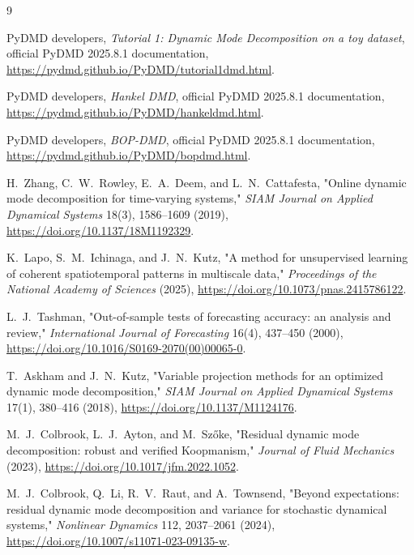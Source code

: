 \documentclass[11pt]{article}
\begin{document}
\begin{thebibliography}{9}

PyDMD developers, \emph{Tutorial 1: Dynamic Mode Decomposition on a toy
dataset}, official PyDMD 2025.8.1 documentation,
\url{https://pydmd.github.io/PyDMD/tutorial1dmd.html}.

PyDMD developers, \emph{Hankel DMD}, official PyDMD 2025.8.1 documentation,
\url{https://pydmd.github.io/PyDMD/hankeldmd.html}.

PyDMD developers, \emph{BOP-DMD}, official PyDMD 2025.8.1 documentation,
\url{https://pydmd.github.io/PyDMD/bopdmd.html}.

H.~Zhang, C.~W.~Rowley, E.~A.~Deem, and L.~N.~Cattafesta,
"Online dynamic mode decomposition for time-varying systems,"
\emph{SIAM Journal on Applied Dynamical Systems} 18(3), 1586--1609 (2019),
\url{https://doi.org/10.1137/18M1192329}.

K.~Lapo, S.~M.~Ichinaga, and J.~N.~Kutz,
"A method for unsupervised learning of coherent spatiotemporal patterns in
multiscale data," \emph{Proceedings of the National Academy of Sciences}
(2025), \url{https://doi.org/10.1073/pnas.2415786122}.

L.~J.~Tashman, "Out-of-sample tests of forecasting accuracy: an analysis and
review," \emph{International Journal of Forecasting} 16(4), 437--450 (2000),
\url{https://doi.org/10.1016/S0169-2070(00)00065-0}.

T.~Askham and J.~N.~Kutz, "Variable projection methods for an optimized
dynamic mode decomposition," \emph{SIAM Journal on Applied Dynamical
Systems} 17(1), 380--416 (2018),
\url{https://doi.org/10.1137/M1124176}.

M.~J.~Colbrook, L.~J.~Ayton, and M.~Szőke, "Residual dynamic mode
decomposition: robust and verified Koopmanism," \emph{Journal of Fluid
Mechanics} (2023), \url{https://doi.org/10.1017/jfm.2022.1052}.

M.~J.~Colbrook, Q.~Li, R.~V.~Raut, and A.~Townsend, "Beyond expectations:
residual dynamic mode decomposition and variance for stochastic dynamical
systems," \emph{Nonlinear Dynamics} 112, 2037--2061 (2024),
\url{https://doi.org/10.1007/s11071-023-09135-w}.

\end{thebibliography}
\end{document}
